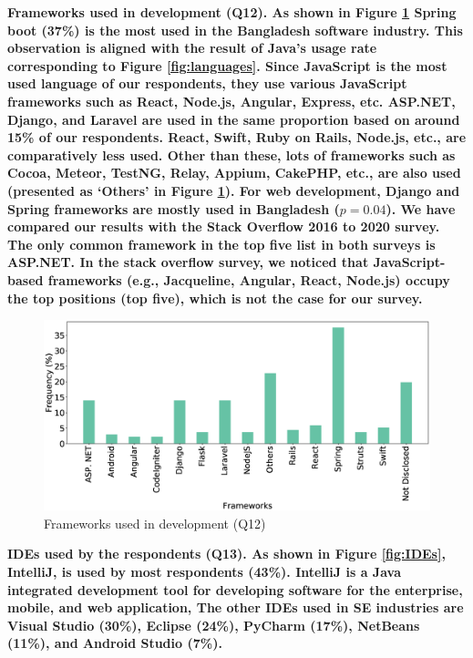 \bf{Frameworks used in development (Q12).} As shown in Figure \ref{fig:frameworks} Spring boot (37\%) is the most used in the Bangladesh software industry. 
This observation is aligned with the result of Java's usage rate corresponding
to Figure \ref{fig:languages}. Since JavaScript is the most used language of our
respondents, they use various JavaScript frameworks such as React, Node.js,
Angular, Express, etc. ASP.NET, Django, and
Laravel are used in the same proportion based on around 15\% of our respondents.
React, Swift, Ruby on Rails, Node.js, etc., are comparatively less used. Other
than these, lots of frameworks such as Cocoa, Meteor, TestNG, Relay, Appium,
CakePHP, etc., are also used (presented as `Others' in Figure \ref{fig:frameworks}). For web development, Django
and Spring frameworks are mostly used in Bangladesh ($p=0.04$). We have compared
our results with the Stack Overflow 2016 to 2020
survey\citep{StackoverflowSurvey2017, StackoverflowSurvey2018,
StackoverflowSurvey2019, StackoverflowSurvey2020}. The only common framework in
the top five list in both surveys is ASP.NET. In the stack overflow survey, we
noticed that JavaScript-based frameworks (e.g., Jacqueline, Angular, React,
Node.js) occupy the top positions (top five), which is not the case for our
survey.

\begin{figure}[t]
\centering
  \includegraphics[scale=0.18]{Figures/Respondents_frameworks}
  \caption{Frameworks used in development (Q12)}
  \label{fig:frameworks}
\end{figure}

\bf{IDEs used by the respondents (Q13).} As shown in Figure \ref{fig:IDEs},
IntelliJ, is used by most respondents (43\%). IntelliJ is a Java integrated development tool for developing software for the
enterprise, mobile, and web application, The
other IDEs used in SE industries are Visual Studio (30\%), Eclipse (24\%),
PyCharm (17\%), NetBeans (11\%), and Android Studio (7\%).

